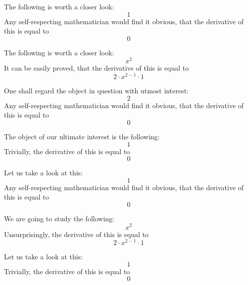 \documentclass{article}
\begin{document}
The following is worth a closer look:
\begin{equation}
1 
\end{equation}
Any self-respecting mathematician would find it obvious, that the derivative of this is equal to
\begin{equation}
0 
\end{equation}

The following is worth a closer look:
\begin{equation}
x ^{2 } 
\end{equation}
It can be easily proved, that the derivative of this is equal to
\begin{equation}
2 \cdot x ^{2 - 1 } \cdot 1 
\end{equation}

One shall regard the object in question with utmost interest:
\begin{equation}
2 
\end{equation}
Any self-respecting mathematician would find it obvious, that the derivative of this is equal to
\begin{equation}
0 
\end{equation}

The object of our ultimate interest is the following:
\begin{equation}
1 
\end{equation}
Trivially, the derivative of this is equal to
\begin{equation}
0 
\end{equation}

Let us take a look at this:
\begin{equation}
1 
\end{equation}
Any self-respecting mathematician would find it obvious, that the derivative of this is equal to
\begin{equation}
0 
\end{equation}

We are going to study the following:
\begin{equation}
x ^{2 } 
\end{equation}
Unsurprisingly, the derivative of this is equal to
\begin{equation}
2 \cdot x ^{2 - 1 } \cdot 1 
\end{equation}

Let us take a look at this:
\begin{equation}
1 
\end{equation}
Trivially, the derivative of this is equal to
\begin{equation}
0 
\end{equation}
\end{document}
